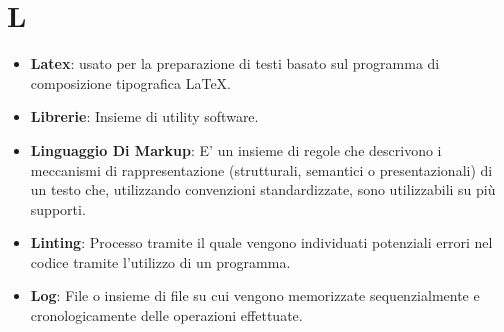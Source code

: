 \section*{L}
\begin{itemize}
	\item
	\textbf{Latex}:  usato per la preparazione di testi basato sul programma di composizione tipografica \LaTeX.
	\item
	\textbf{Librerie}: Insieme di utility software.
	\item
	\textbf{Linguaggio Di Markup}: E' un insieme di regole che descrivono i meccanismi di rappresentazione (strutturali, semantici o presentazionali) di un testo che, utilizzando convenzioni standardizzate, sono utilizzabili su più supporti.
	\item
	\textbf{Linting}: Processo tramite il quale vengono individuati potenziali errori nel codice tramite l'utilizzo di un programma.
	\item
	\textbf{Log}: File o insieme di file su cui vengono memorizzate sequenzialmente e cronologicamente delle operazioni effettuate.
\end{itemize}
\newpage